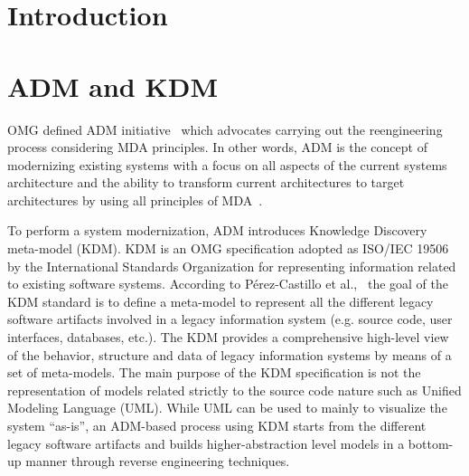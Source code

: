 \documentclass[12pt]{article}
\title{\papertitle}
\author{Rafael S. Durelli\inst{1}, Bruno  M. Santos\inst{2}, Raphael R. Honda\inst{2}, \\  M\'{a}rcio E. Delamaro\inst{1} and Valter V. de Camargo\inst{2}}
\let\cite=\citep
\begin{document}
 

\maketitle

\begin{abstract}

\end{abstract}
\section{Introduction\label{sec:introduction}}
 

% 

\section{ADM and KDM\label{sec:KDM-RE}} 



OMG defined ADM initiative~\cite{1686216} which advocates carrying out the reengineering process considering MDA principles. In other words, ADM is the concept of modernizing existing systems with a focus on all aspects of the current systems architecture and the ability to transform current architectures to target architectures by using all principles of MDA~\cite{Ulrich:2010:IST:1841736}.

To perform a system modernization, ADM introduces Knowledge Discovery meta-model (KDM). KDM is an OMG specification adopted as ISO/IEC 19506 by the International Standards Organization for representing information related to existing software systems. According to P\'{e}rez-Castillo et al.,~\cite{1686216} the goal of the KDM standard is to define a meta-model to represent all the different legacy software artifacts involved in a legacy information system (e.g. source code, user interfaces, databases, etc.). The KDM provides a comprehensive high-level view of the behavior, structure and data of legacy information systems by means of a set of meta-models. The main purpose of the KDM specification is not the representation of models related strictly to the source code nature such as Unified Modeling Language (UML). While UML can be used to mainly to visualize the system ``as-is'', an ADM-based process using KDM starts from the different legacy software artifacts and builds higher-abstraction level models in a bottom-up manner through reverse engineering techniques.
\end{document}
